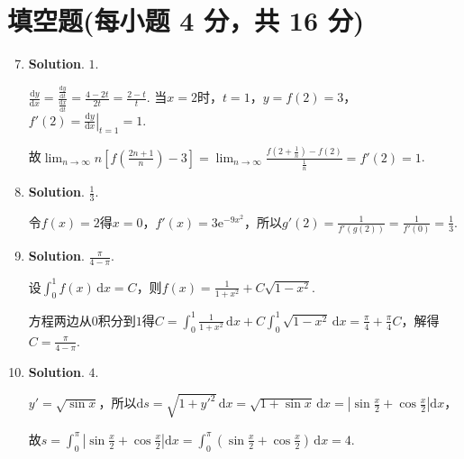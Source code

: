 \documentclass[../Main.tex]{subfiles}
\begin{document}
\section{填空题(每小题 4 分，共 16 分)}
\begin{enumerate}
    \setcounter{enumi}{6}
    \item \textbf{Solution}. $1$.

          $\frac{\mathrm{d}y}{\mathrm{d}x}=\frac{\frac{\mathrm{d}y}{\mathrm{d}t}}{\frac{\mathrm{d}x}{\mathrm{d}t}}
              =\frac{4-2t}{2t}=\frac{2-t}{t}$. 当$x=2$时，$t=1$，$y=f(2)=3$，$f'(2)=\left
              .\frac{\mathrm{d}y}{\mathrm{d}x}\right|_{t=1}=1$.

          故$\lim_{n\to\infty}n\left[f\left(\frac{2n+1}{n}\right)-3\right]=\lim_{n\to\infty}
              \frac{f\left(2+\frac{1}{n}\right)-f(2)}{\frac{1}{n}}=f'(2)=1$.

    \item \textbf{Solution}. $\frac{1}{3}$.

          令$f(x)=2$得$x=0$，$f'(x)=3\mathrm{e}^{-9x^2}$，所以$g'(2)=\frac{1}{f'(g(2))}
              =\frac{1}{f'(0)}=\frac{1}{3}$.

    \item \textbf{Solution}. $\frac{\pi}{4-\pi}$.

          设$\int_{0}^{1} f(x)\,\mathrm{d}x=C$，则$f(x)=\frac{1}{1+x^{2}}+C\sqrt{1-x^{2}}$.

          方程两边从$0$积分到$1$得$C=\int_{0}^{1}\frac{1}{1+x^{2}}\,\mathrm{d}x+C\int_{0}
              ^{1}\sqrt{1-x^{2}}\,\mathrm{d}x=\frac{\pi}{4}+\frac{\pi}{4}C$，解得$C=\frac{\pi}{4-\pi}$.

    \item \textbf{Solution}. $4$.

          $y'=\sqrt{\sin x}$，所以$\mathrm{d}s=\sqrt{1+y'^{2}}\,\mathrm{d}x=\sqrt{1+\sin
                  x}\,\mathrm{d}x=\left|\sin\frac{x}{2}+\cos\frac{x}{2}\right|\mathrm{d}x$，

          故$s=\int_{0}^{\pi}\left|\sin\frac{x}{2}+\cos\frac{x}{2}\right|\mathrm{d}x=
              \int_{0}^{\pi}\left(\sin\frac{x}{2}+\cos\frac{x}{2}\right)\,\mathrm{d}x=4$.
\end{enumerate}
\end{document}
